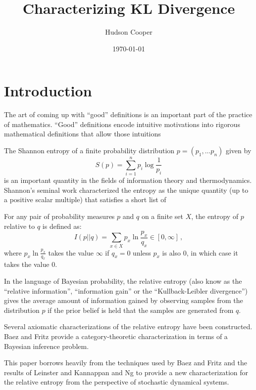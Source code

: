 \documentclass{article}
\title{Characterizing KL Divergence}
\author{Hudson Cooper}
\date{\today}
\begin{document}
\maketitle

\section{Introduction}
The art of coming up with ``good'' definitions is an important part of the practice of mathematics. ``Good'' definitions encode intuitive motivations into rigorous mathematical definitions that allow those intuitions 

The Shannon entropy of a finite probability distribution $p = (p_1, \ldots p_n)$ given by
\begin{equation*}
    S(p) = \sum_{i=1}^n p_i \log \frac{1}{p_i}
\end{equation*}
is an important quantity in the fields of information theory and thermodynamics. Shannon's seminal work \cite{shannonMathematicalTheoryCommunication1948} characterized the entropy as the unique quantity (up to a positive scalar multiple) that satisfies a short list of 

For any pair of probability measures $p$ and $q$ on a finite set $X$, the entropy of $p$ relative to $q$ is defined as:
\begin{equation*}
    I(p || q) = \sum_{x\in X} p_x \ln \frac{p_x}{q_x} \in [0, \infty]\,,
\end{equation*}
where $p_x \ln \frac{p_x}{q_x}$ takes the value $\infty$ if $q_x = 0$ unless $p_x$ is also $0$, in which case it takes the value $0$.

In the language of Bayesian probability, the relative entropy (also know as the ``relative information'', ``information gain'' or the ``Kullback-Leibler divergence'') gives the average amount of information gained by observing samples from the distribution $p$ if the prior belief is held that the samples are generated from $q$.

Several axiomatic characterizations of the relative entropy have been constructed. Baez and Fritz \cite{baezBayesianCharacterizationRelative2014} provide a category-theoretic characterization in terms of a Bayesian inference problem. 

This paper borrows heavily from the techniques used by Baez and Fritz \cite{baezBayesianCharacterizationRelative2014} and the results of Leinster \cite{leinsterShortCharacterizationRelative2017} and Kannappan and Ng \cite{kannappanMeasurableSolutionsFunctional1973} to provide a new characterization for the relative entropy from the perspective of stochastic dynamical systems.
\end{document}
